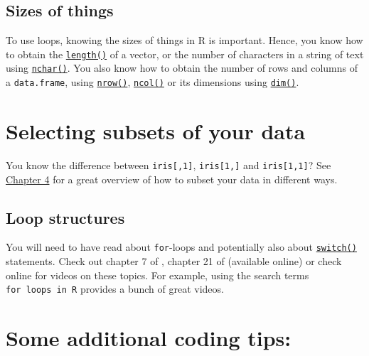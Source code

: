 \documentclass[
]{book}
\begin{document}
\hypertarget{sizes-of-things}{%
\subsection{Sizes of things}\label{sizes-of-things}}

To use loops, knowing the sizes of things in R is important. Hence, you know how to obtain the \href{https://stat.ethz.ch/R-manual/R-devel/library/base/html/length.html}{\texttt{length()}} of a vector, or the number of characters in a string of text using \href{https://stat.ethz.ch/R-manual/R-devel/library/base/html/nchar.html}{\texttt{nchar()}}. You also know how to obtain the number of rows and columns of a \texttt{data.frame}, using \href{https://stat.ethz.ch/R-manual/R-devel/library/base/html/nrow.html}{\texttt{nrow()}}, \href{https://stat.ethz.ch/R-manual/R-devel/library/base/html/ncol.html}{\texttt{ncol()}} or its dimensions using \href{https://stat.ethz.ch/R-manual/R-devel/library/base/html/dim.html}{\texttt{dim()}}.

\hypertarget{selecting-subsets-of-your-data}{%
\section{Selecting subsets of your data}\label{selecting-subsets-of-your-data}}

You know the difference between \texttt{iris{[},1{]}}, \texttt{iris{[}1,{]}} and \texttt{iris{[}1,1{]}}? See \href{https://adv-r.hadley.nz/subsetting.html}{Chapter 4} for a great overview of how to subset your data in different ways.

\hypertarget{loop-structures}{%
\subsection{Loop structures}\label{loop-structures}}

You will need to have read about \texttt{for}-loops and potentially also about \href{https://stat.ethz.ch/R-manual/R-devel/library/base/html/switch.html}{\texttt{switch()}} statements. Check out chapter 7 of \citep{Matloff2011}, chapter 21 of \citep{Wickham2017} (available online) or check online for videos on these topics. For example, using the search terms \texttt{for\ loops\ in\ R} provides a bunch of great videos.

\hypertarget{some-additional-coding-tips}{%
\section{Some additional coding tips:}\label{some-additional-coding-tips}}
\end{document}
